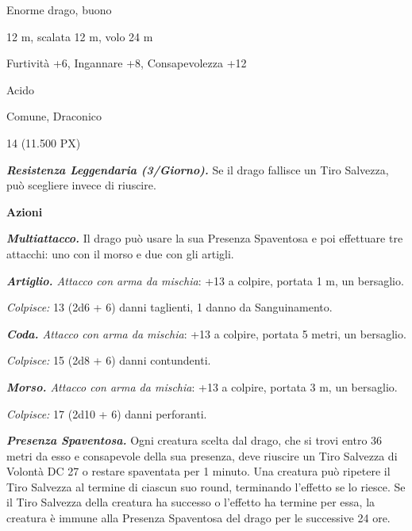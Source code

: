 \begin{multicols}{2}
{
\begin{description}[noitemsep, topsep=0pt, parsep=0pt, partopsep=0pt, itemsep=1pt, leftmargin=2.35cm,  labelwidth=2.2cm, itemindent=0cm, listparindent=0pt] %
\setlength{\baselineskip}{10pt}
\item[\textbf{Taglia/Tipo}] Enorme drago, buono
\item[\textbf{Caratt.}] 
\item[\textbf{Punti Ferita}] 
\item[\textbf{Movimento}] 12 m, scalata 12 m, volo 24 m
\item[\textbf{Tiri Salvez.}] 
\item[\textbf{Comp.}] Furtività +6, Ingannare +8, Consapevolezza +12
\item[\textbf{Imm. Danni}] Acido
\item[\textbf{Sensi}] 
\item[\textbf{Linguaggi}] Comune, Draconico
\item[\textbf{Sfida}] 14 (11.500 PX)
\end{description}
\smallskip

\emph{\textbf{Resistenza Leggendaria (3/Giorno).}} Se il drago fallisce un Tiro Salvezza, può scegliere invece di riuscire.

\textbf{Azioni}

\emph{\textbf{Multiattacco.}} Il drago può usare la sua Presenza Spaventosa e poi effettuare tre attacchi: uno con il morso e due con gli artigli.

\emph{\textbf{Artiglio.} Attacco con arma da mischia}: +13 a colpire, portata 1 m, un bersaglio.

\emph{Colpisce:} 13 (2d6 + 6) danni taglienti, 1 danno da Sanguinamento.

\emph{\textbf{Coda.} Attacco con arma da mischia}: +13 a colpire, portata 5 metri, un bersaglio.

\emph{Colpisce:} 15 (2d8 + 6) danni contundenti.

\emph{\textbf{Morso.} Attacco con arma da mischia}: +13 a colpire, portata 3 m, un bersaglio.

\emph{Colpisce:} 17 (2d10 + 6) danni perforanti.

\emph{\textbf{Presenza Spaventosa.}} Ogni creatura scelta dal drago, che si trovi entro 36 metri da esso e consapevole della sua presenza, deve riuscire un Tiro Salvezza di Volontà DC 27 o restare spaventata per 1 minuto. Una creatura può ripetere il Tiro Salvezza al termine di ciascun suo round, terminando l'effetto se lo riesce. Se il Tiro Salvezza della creatura ha successo o l'effetto ha termine per essa, la creatura è immune alla Presenza Spaventosa del drago per le successive 24 ore.

}
\end{multicols}
